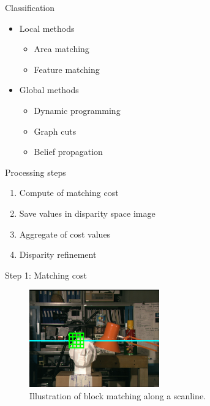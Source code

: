\documentclass[10pt]{beamer}
\begin{document}
\begin{frame}[fragile]{Classification}
  \begin{itemize}
    \item Local methods
    \begin{itemize}
      \item Area matching
      \item Feature matching
    \end{itemize}
    \item Global methods
    \begin{itemize}
      \item Dynamic programming
      \item Graph cuts
      \item Belief propagation
    \end{itemize}
  \end{itemize}
\end{frame}

\begin{frame}[fragile]{Processing steps}
  \begin{enumerate}
    \item Compute of matching cost
    \item Save values in disparity space image
    \item Aggregate of cost values
    \item Disparity refinement
  \end{enumerate}
\end{frame}

\begin{frame}[fragile]{Step 1: Matching cost}
  \begin{figure}[h!]
    \centering
    \includegraphics[width=0.5\textwidth]{../paper/src/images/tsukuba-block.png}
    \caption[Block matching along scanlines]{Illustration of block matching along a scanline.}
  \end{figure}
\end{frame}
\end{document}
